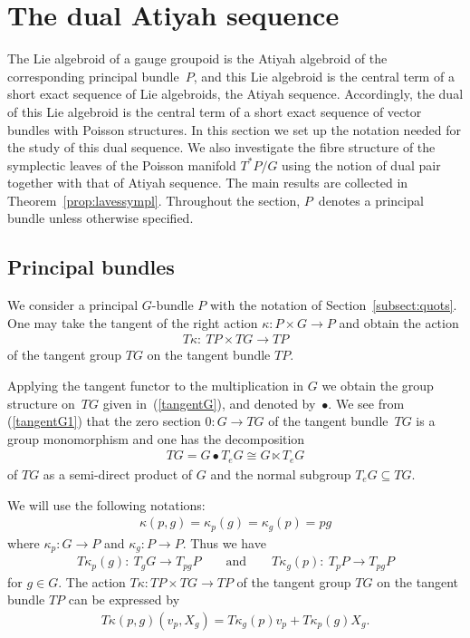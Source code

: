 \documentclass[pdftex]{sigma}
\renewcommand{\to}{\rightarrow}
\newcommand{\sdp}{\ltimes}
\numberwithin{equation}{section}
\begin{document}
\section{The dual Atiyah sequence}\label{sect:dAseq}

The Lie algebroid of a gauge groupoid is the Atiyah algebroid of the corresponding principal bundle~$P$, and this Lie algebroid is the central term of a short exact sequence of Lie algebroids, the Atiyah sequence. Accordingly, the dual of this Lie algebroid is the central term of a short exact sequence of vector bundles with Poisson structures. In this section we set up the notation needed for the study of this dual sequence. We also investigate the f\/ibre structure of the symplectic leaves of the Poisson manifold $T^*P/G$ using the notion of dual pair together with that of Atiyah sequence. The main results are collected in Theorem~\ref{prop:lavessympl}. Throughout the section, $P$~denotes a principal bundle unless otherwise specif\/ied.

\subsection{Principal bundles}

We consider a principal $G$-bundle $P$ with the notation of Section~\ref{subsect:quots}. One may take the tangent of the right action $\kappa\colon P\times G\to P$ and obtain the action{\samepage
\begin{gather*}
T\kappa\colon \ TP\times TG\to TP
\end{gather*}
 of the tangent group $TG$ on the tangent bundle $TP$.}

Applying the tangent functor to the multiplication in $G$ we obtain the group structure on~$TG$ given in~(\ref{tangentG}), and denoted by~$\bullet$. We see from (\ref{tangentG1}) that the zero section $0\colon G\to TG$ of the tangent bundle~$TG$ is a group monomorphism and one has the decomposition{\samepage
\begin{gather*}
TG=G\bullet T_e G \cong G\sdp T_eG
\end{gather*}
of $TG$ as a semi-direct product of $G$ and the normal subgroup $T_e G\subseteq TG$.}

We will use the following notations:
\begin{gather*}%
\kappa(p,g)=\kappa_p(g)=\kappa_g(p)=pg
\end{gather*}
where $\kappa_p\colon G\to P$ and $\kappa_g\colon P\to P$. Thus we have
\begin{gather*}%
T\kappa_p(g)\colon \ T_gG\to T_{pg}P \qquad\text{and}\qquad
T\kappa_g(p)\colon \ T_pP\to T_{pg}P\end{gather*}
for $g\in G$. The action $T\kappa\colon TP\times TG\to TP$ of the tangent group $TG$ on the tangent bundle $TP$ can be expressed by
\begin{gather}\label{actionTG}
T\kappa(p,g)(v_p,X_g)=T\kappa_g(p)v_p+T\kappa_p(g)X_g.
\end{gather}
\end{document}
